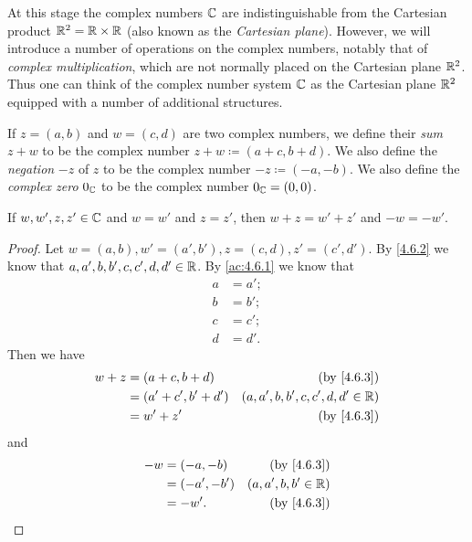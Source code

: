 \begin{note}
  At this stage the complex numbers \(\mathbb{C}\) are indistinguishable from the Cartesian product \(\mathbb{R}^2 = \mathbb{R} \times \mathbb{R}\)
  (also known as the \emph{Cartesian plane}).
  However, we will introduce a number of operations on the complex numbers, notably that of \emph{complex multiplication}, which are not normally placed on the Cartesian plane \(\mathbb{R}^2\).
  Thus one can think of the complex number system \(\mathbb{C}\) as the Cartesian plane \(\mathbb{R}^2\) equipped with a number of additional structures.
\end{note}

\begin{defn}\label{4.6.3}
  If \(z = (a, b)\) and \(w = (c, d)\) are two complex numbers, we define their \emph{sum} \(z + w\) to be the complex number \(z + w \coloneqq (a + c, b + d)\).
  We also define the \emph{negation} \(-z\) of \(z\) to be the complex number \(-z \coloneqq (-a, -b)\).
  We also define the \emph{complex zero} \(0_{\mathbb{C}}\) to be the complex number \(0_{\mathbb{C}} = (0, 0)\).
\end{defn}

\begin{ac}\label{ac:4.6.2}
  If \(w, w', z, z' \in \mathbb{C}\) and \(w = w'\) and \(z = z'\), then \(w + z = w' + z'\) and \(-w = -w'\).
\end{ac}

\begin{proof}
  Let \(w = (a, b), w' = (a', b'), z = (c, d), z' = (c', d')\).
  By \cref{4.6.2} we know that \(a, a', b, b', c, c', d, d' \in \mathbb{R}\).
  By \cref{ac:4.6.1} we know that
  \begin{align*}
    a & = a'; \\
    b & = b'; \\
    c & = c'; \\
    d & = d'.
  \end{align*}
  Then we have
  \begin{align*}
    w + z & = (a + c, b + d)     & \text{(by \cref{4.6.3})}            \\
          & = (a' + c', b' + d') & (a, a', b, b', c, c', d, d' \in \R) \\
          & = w' + z'            & \text{(by \cref{4.6.3})}
  \end{align*}
  and
  \begin{align*}
    -w & = (-a, -b)   & \text{(by \cref{4.6.3})} \\
       & = (-a', -b') & (a, a', b, b' \in \R)    \\
       & = -w'.       & \text{(by \cref{4.6.3})}
  \end{align*}
\end{proof}

